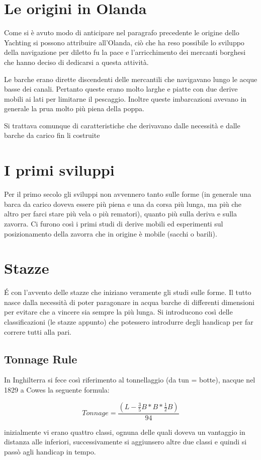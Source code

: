 	\section{Le origini in Olanda}
		Come si è avuto modo di anticipare nel paragrafo precedente le origine dello Yachting si possono attribuire all'Olanda, ciò che ha reso possibile lo sviluppo della navigazione per diletto fu la pace e l'arricchimento dei mercanti borghesi che hanno deciso di dedicarsi a questa attività.
	
		Le barche erano dirette discendenti delle mercantili che navigavano lungo le acque basse dei canali. Pertanto queste erano molto larghe e piatte con due derive mobili ai lati per limitarne il pescaggio. Inoltre queste imbarcazioni avevano in generale la prua molto più piena della poppa.
	
		Si trattava comunque di caratteristiche che derivavano dalle necessità e dalle barche da carico fin li costruite
	
	\section{I primi sviluppi}
		Per il primo secolo gli sviluppi non avvennero tanto sulle forme (in generale una barca da carico doveva essere più piena e una da corsa più lunga, ma più che altro per farci stare più vela o più rematori), quanto più sulla deriva e sulla zavorra. Ci furono così i primi studi di derive mobili ed esperimenti sul posizionamento della zavorra che in origine è mobile (sacchi o barili).
	
	\section{Stazze}
		\'E con l'avvento delle stazze che iniziano veramente gli studi sulle forme. Il tutto nasce dalla necessità di poter paragonare in acqua barche di differenti dimensioni per evitare che a vincere sia sempre la più lunga. Si introducono così delle classificazioni (le stazze appunto) che potessero introdurre degli handicap per far correre tutti alla pari.
	
		\subsection{Tonnage Rule}
			In Inghilterra si fece così riferimento al tonnellaggio (da tun = botte), nacque nel 1829 a Cowes la seguente formula:
		
			\begin{center}
				\begin{equation}
					Tonnage=\frac{(L-\frac{3}{5}B*B*\frac{1}{2}B)}{94}
					\label{eq:Tonnage}
				\end{equation}
			\end{center}
			inizialmente vi erano quattro classi, ognuna delle quali doveva un vantaggio in distanza alle inferiori, successivamente si aggiunsero altre due classi e quindi si passò agli handicap in tempo.
		
